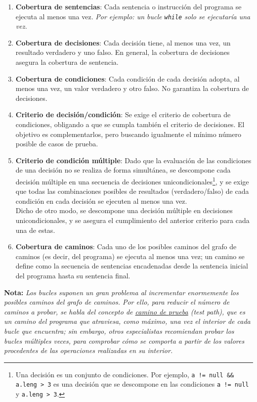 \begin{enumerate}
    \item \textbf{Cobertura de sentencias}: Cada sentencia o instrucción del programa se ejecuta al menos una vez. \textit{Por ejemplo: un bucle \texttt{while} solo se ejecutaría una vez.}

    \item \textbf{Cobertura de decisiones}: Cada decisión tiene, al menos una vez, un resultado verdadero y uno falso. En general, la cobertura de decisiones asegura la cobertura de sentencia.

    \item \textbf{Cobertura de condiciones}: Cada condición de cada decisión adopta, al menos una vez, un valor verdadero y otro falso. No garantiza la cobertura de decisiones.

    \item \textbf{Criterio de decisión/condición}: Se exige el criterio de cobertura de condiciones, obligando a que se cumpla también el criterio de decisiones. El objetivo es complementarlos, pero buscando igualmente el mínimo número posible de casos de prueba.

    \item \textbf{Criterio de condición múltiple}: Dado que la evaluación de las condiciones de una decisión no se realiza de forma simultánea, se descompone cada decisión múltiple en una secuencia de decisiones unicondicionales\footnote{Una decisión es un conjunto de condiciones. Por ejemplo,
              \texttt{a != null \&\& a.leng > 3} es una decisión que se descompone en las condiciones \texttt{a != null} y \texttt{a.leng > 3}.}, y se exige que todas las combinaciones posibles de resultados (verdadero/falso) de cada condición en cada decisión se ejecuten al menos una vez.\\
              Dicho de otro modo, se descompone una decisión múltiple en decisiones unicondicionales, y se asegura el cumplimiento del anterior criterio para cada una de estas.

    \item \textbf{Cobertura de caminos}: Cada uno de los posibles caminos del grafo de caminos (es decir, del programa) se ejecuta al menos una vez; un camino se define como la secuencia de sentencias encadenadas desde la sentencia inicial del programa hasta su sentencia final.
\end{enumerate}

\textbf{Nota:} \textit{Los bucles suponen un gran problema al incrementar enormemente los posibles caminos del grafo de caminos. Por ello, para reducir el número de caminos a probar, se habla del concepto de \uline{camino de prueba} (test path), que es un camino del programa que atraviesa, como máximo, una vez el interior de cada bucle que encuentra; sin embargo, otros especialistas recomiendan probar los bucles múltiples veces, para comprobar cómo se comporta a partir de los valores procedentes de las operaciones realizadas en su interior.}

